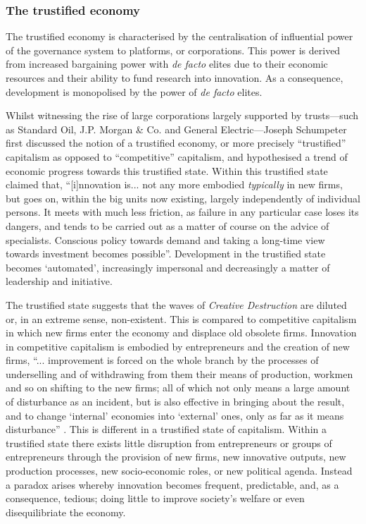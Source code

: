 \subsubsection{The trustified economy}

The trustified economy is characterised by the centralisation of influential power of the governance system to platforms, or corporations. This power is derived from increased bargaining power with \emph{de facto} elites due to their economic resources and their ability to fund research into innovation. As a consequence, development is monopolised by the power of \emph{de facto} elites.

Whilst witnessing the rise of large corporations largely supported by trusts---such as Standard Oil, J.P. Morgan \& Co. and General Electric---Joseph Schumpeter first discussed the notion of a trustified economy, or more precisely ``trustified'' capitalism as opposed to ``competitive'' capitalism, and hypothesised a trend of economic progress towards this trustified state. Within this trustified state \citet[p.~384]{Schumpeter1928} claimed that, ``[i]nnovation is... not any more embodied \emph{typically} in new firms, but goes on, within the big units now existing, largely independently of individual persons. It meets with much less friction, as failure in any particular case loses its dangers, and tends to be carried out as a matter of course on the advice of specialists. Conscious policy towards demand and taking a long-time view towards investment becomes possible''. Development in the trustified state becomes `automated', increasingly impersonal and decreasingly a matter of leadership and initiative.

The trustified state suggests that the waves of \emph{Creative Destruction} are diluted or, in an extreme sense, non-existent. This is compared to competitive capitalism in which new firms enter the economy and displace old obsolete firms. Innovation in competitive capitalism is embodied by entrepreneurs and the creation of new firms, ``... improvement is forced on the whole branch by the processes of underselling and of withdrawing from them their means of production, workmen and so on shifting to the new firms; all of which not only means a large amount of disturbance as an incident, but is also effective in bringing about the result, and to change `internal' economies into `external' ones, only as far as it means disturbance'' \citet[p.~384]{Schumpeter1928}. This is different in a trustified state of capitalism. Within a trustified state there exists little disruption from entrepreneurs or groups of entrepreneurs through the provision of new firms, new innovative outputs, new production processes, new socio-economic roles, or new political agenda. Instead a paradox arises whereby innovation becomes frequent, predictable, and, as a consequence, tedious; doing little to improve society's welfare or even disequilibriate the economy.

